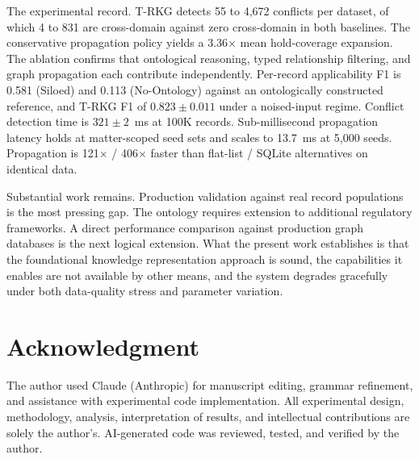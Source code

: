 \documentclass{ieeeaccess}
\begin{document}
The experimental record. T-RKG detects 55 to 4{,}672 conflicts per dataset, of which 4 to 831 are cross-domain against zero cross-domain in both baselines. The conservative propagation policy yields a 3.36$\times$ mean hold-coverage expansion. The ablation confirms that ontological reasoning, typed relationship filtering, and graph propagation each contribute independently. Per-record applicability F1 is 0.581 (Siloed) and 0.113 (No-Ontology) against an ontologically constructed reference, and T-RKG F1 of $0.823 \pm 0.011$ under a noised-input regime. Conflict detection time is $321 \pm 2$~ms at 100K records. Sub-millisecond propagation latency holds at matter-scoped seed sets and scales to 13.7~ms at 5{,}000 seeds. Propagation is 121$\times$ / 406$\times$ faster than flat-list / SQLite alternatives on identical data.

Substantial work remains. Production validation against real record populations is the most pressing gap. The ontology requires extension to additional regulatory frameworks. A direct performance comparison against production graph databases is the next logical extension. What the present work establishes is that the foundational knowledge representation approach is sound, the capabilities it enables are not available by other means, and the system degrades gracefully under both data-quality stress and parameter variation.

\section*{Acknowledgment}

The author used Claude (Anthropic) for manuscript editing, grammar refinement, and assistance with experimental code implementation. All experimental design, methodology, analysis, interpretation of results, and intellectual contributions are solely the author's. AI-generated code was reviewed, tested, and verified by the author.
\end{document}
